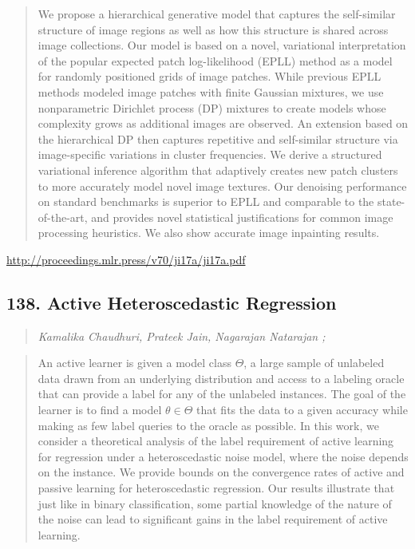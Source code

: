 \documentclass{article}
\begin{document}
\begin{quote}
    We propose a hierarchical generative model that captures the self-similar structure of image regions as well as how this structure is shared across image collections. Our model is based on a novel, variational interpretation of the popular expected patch log-likelihood (EPLL) method as a model for randomly positioned grids of image patches. While previous EPLL methods modeled image patches with finite Gaussian mixtures, we use nonparametric Dirichlet process (DP) mixtures to create models whose complexity grows as additional images are observed. An extension based on the hierarchical DP then captures repetitive and self-similar structure via image-specific variations in cluster frequencies. We derive a structured variational inference algorithm that adaptively creates new patch clusters to more accurately model novel image textures. Our denoising performance on standard benchmarks is superior to EPLL and comparable to the state-of-the-art, and provides novel statistical justifications for common image processing heuristics. We also show accurate image inpainting results.  
\end{quote}

\href{http://proceedings.mlr.press/v70/ji17a/ji17a.pdf}{http://proceedings.mlr.press/v70/ji17a/ji17a.pdf}

\subsection{138. Active Heteroscedastic Regression}

\begin{quote}
\footnotesize{\textit{Kamalika Chaudhuri, Prateek Jain, Nagarajan Natarajan ;}}

\end{quote}

\begin{quote}
    An active learner is given a model class $\Theta$, a large sample of unlabeled data drawn from an underlying distribution and access to a labeling oracle that can provide a label for any of the unlabeled instances. The goal of the learner is to find a model $\theta \in \Theta$ that fits the data to a given accuracy while making as few label queries to the oracle as possible. In this work, we consider a theoretical analysis of the label requirement of active learning for regression under a heteroscedastic noise model, where the noise depends on the instance. We provide bounds on the convergence rates of active and passive learning for heteroscedastic regression. Our results illustrate that just like in binary classification, some partial knowledge of the nature of the noise can lead to significant gains in the label requirement of active learning.  
\end{quote}
\end{document}
